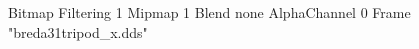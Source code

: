 {Bitmap
	{Filtering 1}
	{Mipmap 1}
	{Blend none}
	{AlphaChannel 0}
	{Frame "breda31tripod_x.dds"}
}

